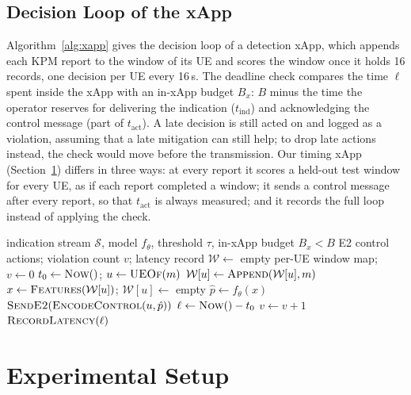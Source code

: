 \documentclass{ieeeaccess}
\begin{document}
\subsection{Decision Loop of the xApp}

Algorithm~\ref{alg:xapp} gives the decision loop of a detection xApp, which appends each KPM report to the window of its UE and scores the window once it holds 16 records, one decision per UE every 16\,s. The deadline check compares the time $\ell$ spent inside the xApp with an in-xApp budget $B_{x}$: $B$ minus the time the operator reserves for delivering the indication ($t_{\mathrm{ind}}$) and acknowledging the control message (part of $t_{\mathrm{act}}$). A late decision is still acted on and logged as a violation, assuming that a late mitigation can still help; to drop late actions instead, the check would move before the transmission. Our timing xApp (Section~\ref{sec:setup}) differs in three ways: at every report it scores a held-out test window for every UE, as if each report completed a window; it sends a control message after every report, so that $t_{\mathrm{act}}$ is always measured; and it records the full loop instead of applying the check.

\begin{algorithm}[t]
\caption{Budget-aware decision loop of a detection xApp}
\label{alg:xapp}
\begin{algorithmic}[1]
\Require indication stream $\mathcal{S}$, model $f_{\theta}$, threshold $\tau$, in-xApp budget $B_{x} < B$
\Ensure E2 control actions; violation count $v$; latency record
\State $\mathcal{W} \gets$ empty per-UE window map; $v \gets 0$
  \State $t_{0} \gets \textsc{Now}()$; \; $u \gets \textsc{UEOf}(m)$
  \State $\mathcal{W}[u] \gets \textsc{Append}(\mathcal{W}[u], m)$
   
    \State $x \gets \textsc{Features}(\mathcal{W}[u])$; \; $\mathcal{W}[u] \gets$ empty
    \State $\hat{p} \gets f_{\theta}(x)$
       \State $\textsc{SendE2}(\textsc{EncodeControl}(u, \hat{p}))$ 
    \EndIf
    \State $\ell \gets \textsc{Now}() - t_{0}$
       \State $v \gets v + 1$ 
    \EndIf
    \State $\textsc{RecordLatency}(\ell)$ 
  \EndIf
\EndFor
\end{algorithmic}
\end{algorithm}

\section{Experimental Setup}
\label{sec:setup}
\end{document}

